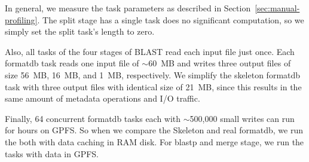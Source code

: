 \documentclass[preprint,12pt]{elsarticle}
\newcommand{\zhaonote}[1]{{\textcolor{cyan}{ ***Zhao:  #1 }}}
\newcommand{\zhaonote}[1]{}
\begin{document}

In general, we measure the task parameters as described in Section~\ref{sec:manual-profiling}.
The split stage has a single task does no significant 
computation, so we simply set the split task's length to zero. 


Also, all tasks of the four stages of BLAST read each input file just once. Each formatdb task reads one input file of $\sim$60~MB 
and writes three output files of size 56~MB, 16~MB, and 1~MB, respectively. We simplify the skeleton formatdb task with three
output files with identical size of 21~MB, since this results in the same amount of metadata operations and I/O traffic.

Finally, 64 concurrent formatdb tasks each with $\sim$500,000 small writes can run for hours on
GPFS. So when we compare the Skeleton and real formatdb, we run the both with data caching in RAM disk. For blastp and merge stage, we run the tasks with data in GPFS.

\end{document}

